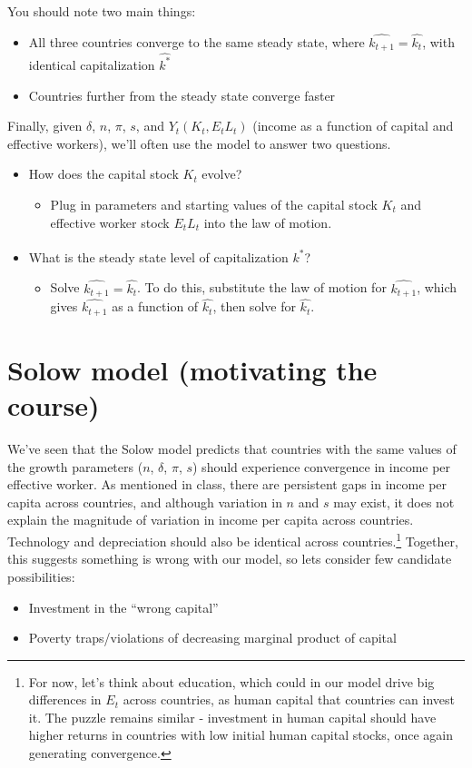 \documentclass[12pt,english]{article}
\begin{document}
You should note two main things:
\begin{itemize}
	\item All three countries converge to the same steady state, where $\widehat{k_{t + 1}} = \widehat{k_{t}}$, with identical capitalization $\widehat{k^{*}}$
	\item Countries further from the steady state converge faster
\end{itemize}

Finally, given $\delta$, $n$, $\pi$, $s$, and $Y_{t}(K_{t}, E_{t} L_{t})$ (income as a function of capital and effective workers), we'll often use the model to answer two questions.
\begin{itemize}
	\item How does the capital stock $K_{t}$ evolve?
	\begin{itemize}
		\item Plug in parameters and starting values of the capital stock $K_{t}$ and effective worker stock $E_{t} L_{t}$ into the law of motion.
	\end{itemize}
	\item What is the steady state level of capitalization $\widehat{k^{*}}$?
	\begin{itemize}
		\item Solve $\widehat{k_{t + 1}} = \widehat{k_{t}}$. To do this, substitute the law of motion for $\widehat{k_{t + 1}}$, which gives $\widehat{k_{t + 1}}$ as a function of $\widehat{k_{t}}$, then solve for $\widehat{k_{t}}$.
	\end{itemize}
\end{itemize}

\section{Solow model (motivating the course)}

We've seen that the Solow model predicts that countries with the same values of the growth parameters ($n$, $\delta$, $\pi$, $s$) should experience convergence in income per effective worker. As mentioned in class, there are persistent gaps in income per capita across countries, and although variation in $n$ and $s$ may exist, it does not explain the magnitude of variation in income per capita across countries. Technology and depreciation should also be identical across countries.\footnote{For now, let's think about education, which could in our model drive big differences in $E_{t}$ across countries, as human capital that countries can invest it. The puzzle remains similar - investment in human capital should have higher returns in countries with low initial human capital stocks, once again generating convergence.} Together, this suggests something is wrong with our model, so lets consider few candidate possibilities:
\begin{itemize}
	\item Investment in the ``wrong capital''
	\item Poverty traps/violations of decreasing marginal product of capital
\end{itemize}
\end{document}
